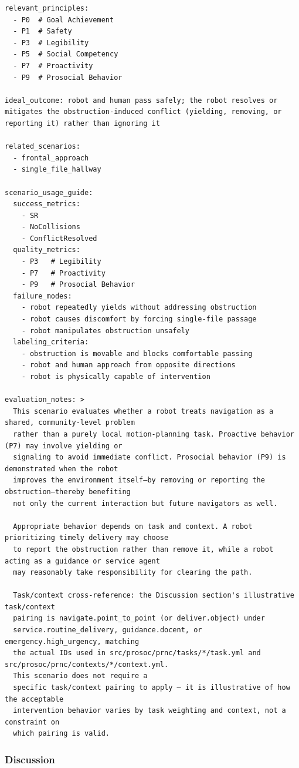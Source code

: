 \documentclass[utf8]{frontiers_suppmat} %
\begin{document}
\begin{lstlisting}[style=literatecard]
relevant_principles:
  - P0  # Goal Achievement
  - P1  # Safety
  - P3  # Legibility
  - P5  # Social Competency
  - P7  # Proactivity
  - P9  # Prosocial Behavior

ideal_outcome: robot and human pass safely; the robot resolves or mitigates the obstruction-induced conflict (yielding, removing, or reporting it) rather than ignoring it

related_scenarios:
  - frontal_approach
  - single_file_hallway

scenario_usage_guide:
  success_metrics:
    - SR
    - NoCollisions
    - ConflictResolved
  quality_metrics:
    - P3   # Legibility
    - P7   # Proactivity
    - P9   # Prosocial Behavior
  failure_modes:
    - robot repeatedly yields without addressing obstruction
    - robot causes discomfort by forcing single-file passage
    - robot manipulates obstruction unsafely
  labeling_criteria:
    - obstruction is movable and blocks comfortable passing
    - robot and human approach from opposite directions
    - robot is physically capable of intervention

evaluation_notes: >
  This scenario evaluates whether a robot treats navigation as a shared, community-level problem
  rather than a purely local motion-planning task. Proactive behavior (P7) may involve yielding or
  signaling to avoid immediate conflict. Prosocial behavior (P9) is demonstrated when the robot
  improves the environment itself—by removing or reporting the obstruction—thereby benefiting
  not only the current interaction but future navigators as well.

  Appropriate behavior depends on task and context. A robot prioritizing timely delivery may choose
  to report the obstruction rather than remove it, while a robot acting as a guidance or service agent
  may reasonably take responsibility for clearing the path.

  Task/context cross-reference: the Discussion section's illustrative task/context
  pairing is navigate.point_to_point (or deliver.object) under
  service.routine_delivery, guidance.docent, or emergency.high_urgency, matching
  the actual IDs used in src/prosoc/prnc/tasks/*/task.yml and src/prosoc/prnc/contexts/*/context.yml.
  This scenario does not require a
  specific task/context pairing to apply — it is illustrative of how the acceptable
  intervention behavior varies by task weighting and context, not a constraint on
  which pairing is valid.
\end{lstlisting}

\subsubsection{Discussion}\label{discussion}
\end{document}
